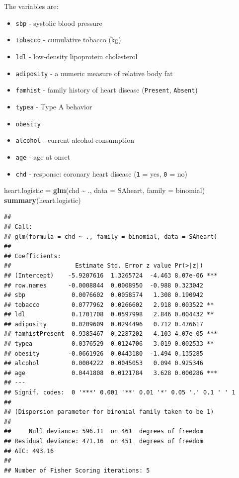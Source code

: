 \documentclass[
]{book}
\newenvironment{Shaded}{\begin{snugshade}}{\end{snugshade}}
\newcommand{\AttributeTok}[1]{\textcolor[rgb]{0.13,0.29,0.53}{#1}}
\newcommand{\FunctionTok}[1]{\textcolor[rgb]{0.13,0.29,0.53}{\textbf{#1}}}
\newcommand{\NormalTok}[1]{#1}
\newcommand{\OtherTok}[1]{\textcolor[rgb]{0.56,0.35,0.01}{#1}}
\newcommand{\SpecialCharTok}[1]{\textcolor[rgb]{0.81,0.36,0.00}{\textbf{#1}}}
\begin{document}
The variables are:

\begin{itemize}
\item
  \texttt{sbp} - systolic blood pressure
\item
  \texttt{tobacco} - cumulative tobacco (kg)
\item
  \texttt{ldl} - low-density lipoprotein cholesterol
\item
  \texttt{adiposity} - a numeric measure of relative body fat
\item
  \texttt{famhist} - family history of heart disease (\texttt{Present}, \texttt{Absent})
\item
  \texttt{typea} - Type A behavior
\item
  \texttt{obesity}
\item
  \texttt{alcohol} - current alcohol consumption
\item
  \texttt{age} - age at onset
\item
  \texttt{chd} - response: coronary heart disease (\texttt{1} = yes, \texttt{0} = no)
\end{itemize}

\begin{Shaded}
\begin{Highlighting}[]
\NormalTok{heart.logistic }\OtherTok{=} \FunctionTok{glm}\NormalTok{(chd }\SpecialCharTok{\textasciitilde{}}\NormalTok{ ., }\AttributeTok{data =}\NormalTok{ SAheart, }\AttributeTok{family =}\NormalTok{ binomial)}
\FunctionTok{summary}\NormalTok{(heart.logistic)}
\end{Highlighting}
\end{Shaded}

\begin{verbatim}
## 
## Call:
## glm(formula = chd ~ ., family = binomial, data = SAheart)
## 
## Coefficients:
##                  Estimate Std. Error z value Pr(>|z|)    
## (Intercept)    -5.9207616  1.3265724  -4.463 8.07e-06 ***
## row.names      -0.0008844  0.0008950  -0.988 0.323042    
## sbp             0.0076602  0.0058574   1.308 0.190942    
## tobacco         0.0777962  0.0266602   2.918 0.003522 ** 
## ldl             0.1701708  0.0597998   2.846 0.004432 ** 
## adiposity       0.0209609  0.0294496   0.712 0.476617    
## famhistPresent  0.9385467  0.2287202   4.103 4.07e-05 ***
## typea           0.0376529  0.0124706   3.019 0.002533 ** 
## obesity        -0.0661926  0.0443180  -1.494 0.135285    
## alcohol         0.0004222  0.0045053   0.094 0.925346    
## age             0.0441808  0.0121784   3.628 0.000286 ***
## ---
## Signif. codes:  0 '***' 0.001 '**' 0.01 '*' 0.05 '.' 0.1 ' ' 1
## 
## (Dispersion parameter for binomial family taken to be 1)
## 
##     Null deviance: 596.11  on 461  degrees of freedom
## Residual deviance: 471.16  on 451  degrees of freedom
## AIC: 493.16
## 
## Number of Fisher Scoring iterations: 5
\end{verbatim}
\end{document}
